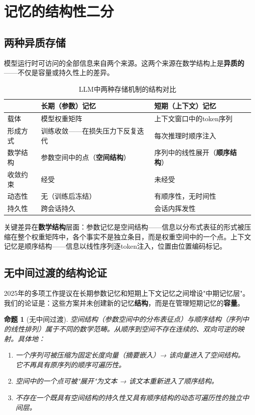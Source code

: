 \documentclass[11pt,a4paper]{ctexart}
\newtheorem{proposition}[theorem]{命题}
\begin{document}
\section{记忆的结构性二分}

\subsection{两种异质存储}

模型运行时可访问的全部信息来自两个来源。这两个来源在数学结构上是\textbf{异质的}——不仅是容量或持久性上的差异。

\begin{table}[htbp]
\centering
\caption{LLM中两种存储机制的结构对比}
\label{tab:memory}
\begin{tabular}{@{}p{2.8cm}ll@{}}
\toprule
& \textbf{长期（参数）记忆} & \textbf{短期（上下文）记忆} \\
\midrule
载体      & 模型权重矩阵 & 上下文窗口中的token序列 \\
形成方式  & 训练收敛——在损失压力下反复迭代 & 每次推理时顺序注入 \\
数学结构  & 参数空间中的点（\textbf{空间结构}） & 序列中的线性展开（\textbf{顺序结构}） \\
收敛约束  & 经受 & 未经受 \\
动态性    & 无（训练后冻结） & 有顺序性，无时间性 \\
持久性    & 跨会话持久 & 会话内挥发性 \\
\bottomrule
\end{tabular}
\end{table}

关键差异在\textbf{数学结构}层面：参数记忆是空间结构——信息以分布式表征的形式被压缩在整个权重矩阵中，各个事实不是独立条目，而是权重空间中的一个点。上下文记忆是顺序结构——信息以线性序列逐token注入，位置由位置编码标记。

\subsection{无中间过渡的结构论证}

2025年的多项工作提议在长期参数记忆和短期上下文记忆之间增设"中期记忆层"\cite{HAMR2025,MemGPT2024,MemoryBear2025}。我们的论证是：这些方案并未创建新的记忆\textbf{结构}，而是在管理短期记忆的\textbf{容量}。

\begin{proposition}[无中间过渡]
    空间结构（参数空间中的分布表征点）与顺序结构（序列中的线性排列）属于不同的数学范畴。从顺序到空间不存在连续的、双向可逆的映射。具体地：
    \begin{enumerate}[leftmargin=*]
        \item 一个序列可被压缩为固定长度向量（摘要嵌入）→ 该向量进入了空间结构。它不再具有原序列的顺序可遍历性。
        \item 空间中的一个点可被"展开"为文本 → 该文本重新进入了顺序结构。
        \item 不存在一个\textit{既具有空间结构的持久性又具有顺序结构的动态可遍历性}的独立中间层。
    \end{enumerate}
\end{proposition}
\end{document}
